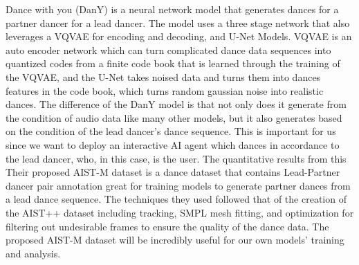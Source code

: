 \documentclass[final,5p,times,twocolumn,authoryear]{article}
\begin{document}
Dance with you (DanY) \cite{Yao2023} is a neural network model that generates
dances for a partner dancer for a lead dancer. The model uses a three
stage network that also leverages a VQVAE for encoding and decoding, and
U-Net Models. VQVAE is an auto encoder network which can turn complicated dance data sequences into quantized
codes from a finite code book that is learned through the training of
the VQVAE, and the U-Net takes noised data and turns them into dances
features in the code book, which turns random gaussian noise into
realistic dances. The difference of the DanY model is that not only does
it generate from the condition of audio data like many other models, but
it also generates based on the condition of the lead dancer's dance
sequence. This is important for us since we want to deploy an
interactive AI agent which dances in accordance to the lead dancer, who,
in this case, is the user. The quantitative results from this 
Their proposed AIST-M dataset is a dance dataset that contains
Lead-Partner dancer pair annotation great for training models to
generate partner dances from a lead dance sequence. The techniques they used followed that of the creation of the
AIST++ dataset \cite{Li2021} including tracking, SMPL mesh fitting, and
optimization for filtering out undesirable frames to ensure the quality
of the dance data. The proposed AIST-M dataset will be incredibly useful
for our own models' training and analysis.

 

\end{document}
